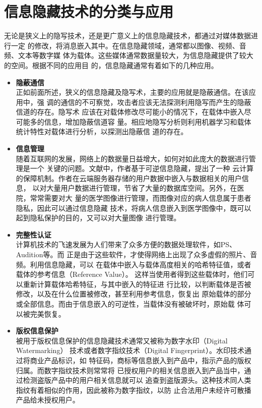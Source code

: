 \section{信息隐藏技术的分类与应用}
\label{s:type_application_data_hiding}
无论是狭义上的隐写技术，还是更广意义上的信息隐藏技术，都通过对媒体数据进行一定
的修改，将消息嵌入其中。在信息隐藏领域，通常都以图像、视频、音频、文本等数字媒
体为载体。这些媒体通常数据量较大，为信息隐藏提供了较大的空间。根据不同的应用目
的，信息隐藏通常有着如下的几种应用。
\par
\vspace{-4mm}
\begin{itemize}
  \item \textbf{隐蔽通信}\\
  正如前面所述，狭义的信息隐藏及隐写术，主要的应用就是隐蔽通信。在该应用中，强
  调的通信的不可察觉，攻击者应该无法探测利用隐写而产生的隐蔽信道的存在。隐写术
  应该在对载体修改尽可能小的情况下，在载体中嵌入尽可能多的信息，增加隐蔽信道容
  量。相应地隐写分析则利用机器学习和载体统计特性对载体进行分析，以探测出隐蔽信
  道的存在。
  \par
  \vspace{-2.5mm}
  \item \textbf{信息管理}\\
  随着互联网的发展，网络上的数据量日益增大，如何对如此庞大的数据进行管理是一个
  关键的问题。文献\cite{hwang2010trusted}中，作者基于可逆信息隐藏，提出了一种
  云计算的保障机制。作者在云端服务器存储的用户数据中嵌入与数据相关的用户信息，
  以对大量用户数据进行管理，节省了大量的数据库空间。另外，在医院，常常需要对大
  量的医学图像进行管理，而图像对应的病人信息属于患者隐私，因此可以通过信息隐藏
  技术，将病人信息嵌入到医学图像中，既可以起到隐私保护的目的，又可以对大量图像
  进行管理。
  \par
  \vspace{-2.5mm}
  \item \textbf{完整性认证}\\
  计算机技术的飞速发展为人们带来了众多方便的数据处理软件，如PS、Audition等。而
  正是由于这些软件，才使得网络上出现了众多虚假的照片、音频。利用信息隐藏，可以
  在载体中嵌入与载体高度相关的哈希特征值，或者载体的参考信息（Reference Value）。
  这样当使用者得到这些载体时，他们可以重新计算载体哈希特征，与其中嵌入的特征进
  行比较，以判断载体是否被修改，以及在什么位置被修改，甚至利用参考信息，恢复出
  原始载体的部分或全部信息。而由于信息嵌入的可逆性，当载体没有被破坏时，原始载
  体可以被完美恢复。
  \par
  \vspace{-4mm}
  \item \textbf{版权信息保护}\\
  被用于版权信息保护的信息隐藏技术通常又被称为数字水印（Digital Watermarking）
  技术或者数字指纹技术（Digital Fingerprint）。水印技术通过将商业产品标识，如
  特征码，商标等信息嵌入到产品中，指示产品的版权归属。而数字指纹技术则常常将
  已授权用户的相关信息嵌入到产品当中，通过检测盗版产品中的用户相关信息就可以
  追查到盗版源头。这种技术同人类指纹有着相似的作用，因此被称为数字指纹，以防
  止合法用户未经许可散播产品给未授权用户。\\
\end{itemize}



